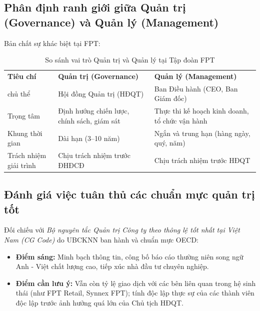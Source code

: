 \subsection{Phân định ranh giới giữa Quản trị (Governance) và Quản lý (Management)}
Bản chất sự khác biệt tại FPT:
\begin{table}[htbp]
\centering
\caption{So sánh vai trò Quản trị và Quản lý tại Tập đoàn FPT}
\label{tab:quan_tri_vs_quan_ly}
\begin{tabularx}{\textwidth}{p{3.2cm} X X}
\toprule
\textbf{Tiêu chí} & \textbf{Quản trị (Governance)} & \textbf{Quản lý (Management)} \\
 chủ thể & Hội đồng Quản trị (HĐQT) & Ban Điều hành (CEO, Ban Giám đốc) \\
Trọng tâm & Định hướng chiến lược, chính sách, giám sát & Thực thi kế hoạch kinh doanh, tổ chức vận hành \\
Khung thời gian & Dài hạn (3--10 năm) & Ngắn và trung hạn (hàng ngày, quý, năm) \\
Trách nhiệm giải trình & Chịu trách nhiệm trước ĐHĐCĐ & Chịu trách nhiệm trước HĐQT \\
\bottomrule
\end{tabularx}
\end{table}

\subsection{Đánh giá việc tuân thủ các chuẩn mực quản trị tốt}
Đối chiếu với \textit{Bộ nguyên tắc Quản trị Công ty theo thông lệ tốt nhất tại Việt Nam (CG Code)} do UBCKNN ban hành và chuẩn mực OECD:
\begin{itemize}
    \item \textbf{Điểm sáng:} Minh bạch thông tin, công bố báo cáo thường niên song ngữ Anh - Việt chất lượng cao, tiếp xúc nhà đầu tư chuyên nghiệp.
    \item \textbf{Điểm cần lưu ý:} Vẫn còn tỷ lệ giao dịch với các bên liên quan trong hệ sinh thái (như FPT Retail, Synnex FPT); tính độc lập thực sự của các thành viên độc lập trước ảnh hưởng quá lớn của Chủ tịch HĐQT.
\end{itemize}
